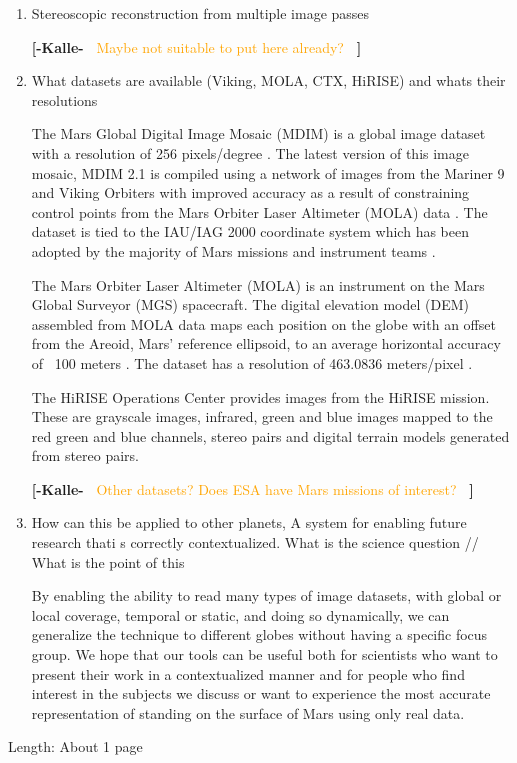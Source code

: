 \documentclass[journal]{vgtc}                %
\newcommand{\kallecomment}[1]{\textbf{[-Kalle-~}
    \textcolor{orange}{#1}
    \textbf{~]}}
\begin{document}
\begin{enumerate}
\item Stereoscopic reconstruction from multiple image passes

\kallecomment{Maybe not suitable to put here already?}

\item What datasets are available (Viking, MOLA, CTX, HiRISE) and whats their resolutions

The Mars Global Digital Image Mosaic (MDIM) is a global image dataset with a resolution of 256 pixels/degree \cite{MDIM2.1_web}.
The latest version of this image mosaic, MDIM 2.1 is compiled using a network of images from the Mariner 9 and Viking Orbiters with improved accuracy as a result of constraining control points from the Mars Orbiter Laser Altimeter (MOLA) data \cite{MDIM2.1}.
The dataset is tied to the IAU/IAG 2000 coordinate system which has been adopted by the majority of Mars missions and instrument teams \cite{MDIM2.1}.

The Mars Orbiter Laser Altimeter (MOLA) is an instrument on the Mars Global Surveyor (MGS) spacecraft.
The digital elevation model (DEM) assembled from MOLA data maps each position on the globe with an offset from the Areoid, Mars' reference ellipsoid, to an average horizontal accuracy of ~100 meters \cite{MOLA}. The dataset has a resolution of 463.0836 meters/pixel \cite{MOLA}.

The HiRISE Operations Center provides images from the HiRISE mission. These are grayscale images, infrared, green and blue images mapped to the red green and blue channels, stereo pairs and digital terrain models generated from stereo pairs.

\kallecomment{Other datasets? Does ESA have Mars missions of interest?}

\item How can this be applied to other planets, A system for enabling future research thati s correctly contextualized. What is the science question // What is the point of this

By enabling the ability to read many types of image datasets, with global or local coverage, temporal or static, and doing so dynamically, we can generalize the technique to different globes without having a specific focus group.
We hope that our tools can be useful both for scientists who want to present their work in a contextualized manner and for people who find interest in the subjects we discuss or want to experience the most accurate representation of standing on the surface of Mars using only real data.

\end{enumerate}
Length: About 1 page
\end{document}
